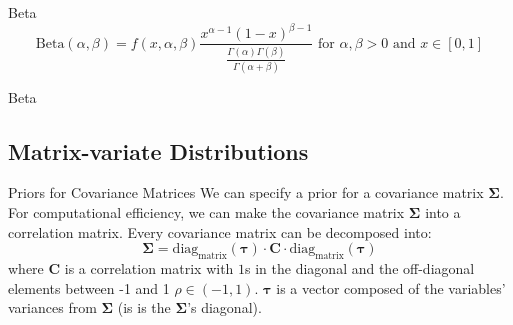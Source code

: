 \begin{frame}[noframenumbering]{Beta}
	$$\text{Beta} (\alpha, \beta) = f(x, \alpha, \beta) \frac{x^{\alpha-1}(1-x)^{\beta-1}} {\frac{\Gamma (\alpha )\Gamma (\beta )}{\Gamma (\alpha +\beta )}} \text{ for $\alpha,\beta > 0$ and $x \in [0, 1]$}$$
\end{frame}

\begin{frame}[noframenumbering]{Beta}
	\centering
\end{frame}

\subsection*{Matrix-variate Distributions}
\begin{frame}[noframenumbering]{Priors for Covariance Matrices}
	We can specify a prior for a covariance matrix
	$\boldsymbol{\Sigma}$.
	\vfill
	For computational efficiency,
	we can make the covariance matrix $\boldsymbol{\Sigma}$ into a correlation matrix.
	Every covariance matrix can be decomposed into:
	$$
		\boldsymbol{\Sigma}=\text{diag}_\text{matrix}(\boldsymbol{\tau}) \cdot \mathbf{C} \cdot \text{diag}_\text{matrix}(\boldsymbol{\tau})
	$$
	where $\mathbf{C}$ is a correlation matrix with
	$1$s in the diagonal and the off-diagonal elements between -1 and 1 $\rho \in (-1, 1)$.
	$\boldsymbol{\tau}$ is a vector composed of the variables' variances from
	$\boldsymbol{\Sigma}$ (is is the $\boldsymbol{\Sigma}$'s diagonal).
\end{frame}

